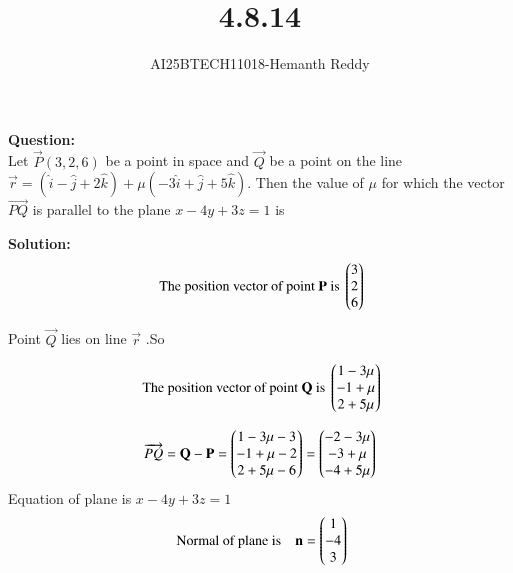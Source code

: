 \documentclass[journal]{IEEEtran}
\begin{document}

\vspace{3cm}

\title{4.8.14}
\author{AI25BTECH11018-Hemanth Reddy}
 \maketitle
{\let\newpage\relax\maketitle}

\renewcommand{\thefigure}{\theenumi}
\renewcommand{\thetable}{\theenumi}
\setlength{\intextsep}{10pt} %


\renewcommand{\thetable}{\theenumi}

\textbf{Question:}\\

Let $\vec{P} (3,2,6)$ be a point in space and $\vec{Q}$ be a point on the line
$ \vec{r} = (\hat{i} - \hat{j} + 2\hat{k}) + \mu(-3\hat{i} + \hat{j} + 5\hat{k}). $
Then the value of $\mu$ for which the vector $\overrightarrow{PQ}$ is parallel to the plane $x - 4y + 3z = 1$ is 


\textbf{Solution:}\\


\begin{align}
   \text{ The position vector of point }  \mathbf{P} \text{ is }
 \begin{pmatrix} 3 \\ 2\\ 6 \end{pmatrix} 
\end{align}

Point $\vec{Q}$ lies on line $\vec{r}$ .So

\begin{align}
   \text{ The position vector of point }  \mathbf{Q} \text{ is }
 \begin{pmatrix} 1-3\mu\\ -1+\mu \\ 2+5\mu \end{pmatrix} 
\end{align}

\begin{align}
    \overrightarrow{PQ} = \mathbf{Q} -\mathbf{P} = \begin{pmatrix} 1-3\mu-3\\ -1+\mu -2\\ 2+5\mu -6\end{pmatrix} = \begin{pmatrix} -2-3\mu\\ -3+\mu \\ -4+5\mu \end{pmatrix} 
\end{align}
Equation of plane is $x - 4y + 3z = 1$ 
\begin{align}
    \text{ Normal of plane is} \quad \mathbf{n} =\begin{pmatrix} 1 \\ -4\\ 3 \end{pmatrix} 
\end{align}
\end{document}
